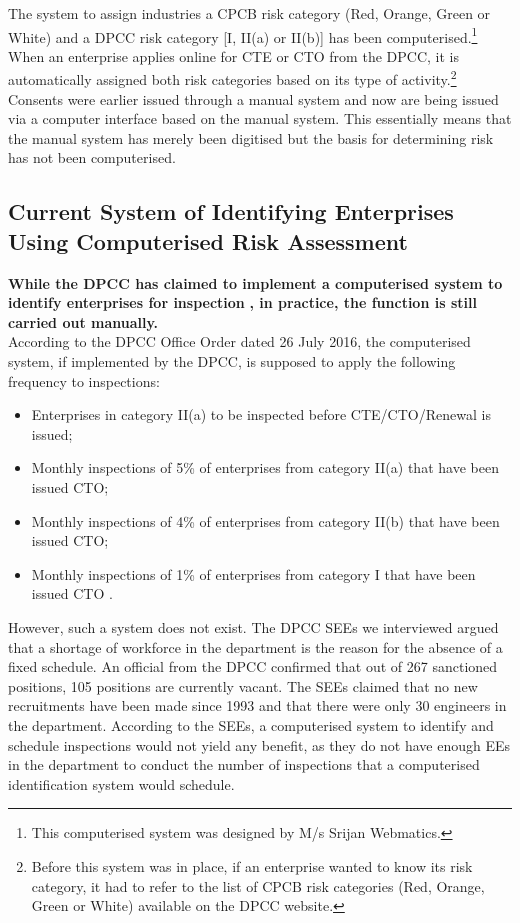 \documentclass[a4paper, 12pt]{article}
\begin{document}
                 
                 The system to assign industries a CPCB risk category (Red, Orange, Green or White) and a DPCC risk category [I, II(a) or II(b)] has been computerised.\footnote{This computerised system was designed by M/s Srijan Webmatics.} When an enterprise applies online for CTE or CTO from the DPCC, it is automatically assigned both risk categories based on its type of activity.\footnote{Before this system was in place, if an enterprise wanted to know its risk category, it had to refer to the list of CPCB risk categories (Red, Orange, Green or White) available on the DPCC website.} Consents were earlier issued through a manual system and now are being issued via a computer interface based on the manual system. This essentially means that the manual system has merely been digitised but the basis for determining risk has not been computerised. 

	\subsection{Current System of Identifying Enterprises Using Computerised Risk Assessment}
	
	\textbf{While the DPCC has claimed to implement a computerised system to identify enterprises for inspection} \parencite{DIPPb}\textbf{, in practice, the function is still carried out manually.} \\
	
	According to the DPCC Office Order dated 26 July 2016, the computerised system, if implemented by the DPCC, is supposed to apply the following frequency to inspections: 
	
	\begin{itemize}
	\item{Enterprises in category II(a) to be inspected before CTE/CTO/Renewal is issued;}
	\item{Monthly inspections of 5\% of enterprises from category II(a) that have been issued CTO;}
	\item{Monthly inspections of 4\% of enterprises from category II(b) that have been issued CTO;}
	\item{Monthly inspections of 1\% of enterprises from category I that have been issued CTO \parencite{DPCCb}.}
	\end{itemize} 
	
	However, such a system does not exist. The DPCC SEEs we interviewed argued that a shortage of workforce in the department is the reason for the absence of a fixed schedule. An official from the DPCC confirmed that out of 267 sanctioned positions, 105 positions are currently vacant. The SEEs claimed that no new recruitments have been made since 1993 and that there were only 30 engineers in the department. According to the SEEs, a computerised system to identify and schedule inspections would not yield any benefit, as they do not have enough EEs in the department to conduct the number of inspections that a computerised identification system would schedule. \\
	
\end{document}
